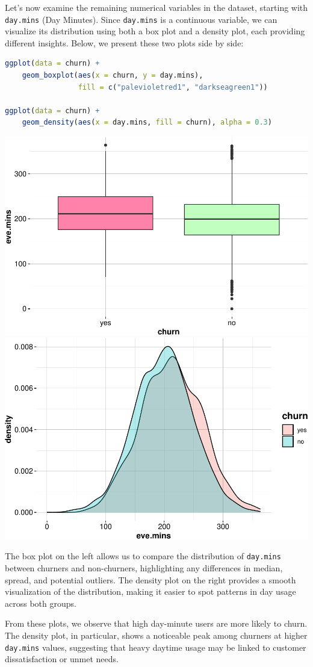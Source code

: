 \documentclass[
]{book}
\newcommand{\passthrough}[1]{#1}
\theoremstyle{definition}
\theoremstyle{definition}
\theoremstyle{definition}
\theoremstyle{definition}
\theoremstyle{remark}
\begin{document}
Let's now examine the remaining numerical variables in the dataset, starting with \passthrough{\lstinline!day.mins!} (Day Minutes). Since \passthrough{\lstinline!day.mins!} is a continuous variable, we can visualize its distribution using both a box plot and a density plot, each providing different insights. Below, we present these two plots side by side:

\begin{lstlisting}[language=R]
ggplot(data = churn) +
    geom_boxplot(aes(x = churn, y = day.mins), 
                 fill = c("palevioletred1", "darkseagreen1"))

ggplot(data = churn) +
    geom_density(aes(x = day.mins, fill = churn), alpha = 0.3)
\end{lstlisting}

\includegraphics[width=0.5\linewidth]{EDA_files/figure-latex/unnamed-chunk-12-1} \includegraphics[width=0.5\linewidth]{EDA_files/figure-latex/unnamed-chunk-12-2}

The box plot on the left allows us to compare the distribution of \passthrough{\lstinline!day.mins!} between churners and non-churners, highlighting any differences in median, spread, and potential outliers. The density plot on the right provides a smooth visualization of the distribution, making it easier to spot patterns in day usage across both groups.

From these plots, we observe that high day-minute users are more likely to churn. The density plot, in particular, shows a noticeable peak among churners at higher \passthrough{\lstinline!day.mins!} values, suggesting that heavy daytime usage may be linked to customer dissatisfaction or unmet needs.
\end{document}
